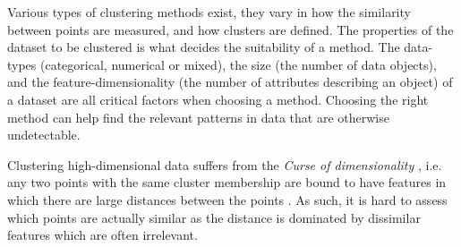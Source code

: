 \documentclass[../report.tex]{subfiles}
\begin{document}








Various types of clustering methods exist, they vary in how the similarity between points are measured, and how clusters are defined.
The properties of the dataset to be clustered is what decides the suitability of a method. The data-types (categorical, numerical or mixed), the size (the number of data objects), and the feature-dimensionality (the number of attributes describing an object) of a dataset are all critical factors when choosing a method. Choosing the right method can help find the relevant patterns in data that are otherwise undetectable.

Clustering high-dimensional data suffers from the \textit{Curse of dimensionality} \cite{Jain1999, Parsons2004, Deng2010}, i.e. any two points with the same cluster membership are bound to have features in which there are large distances between the points \cite{Domeniconi2007}. As such, it is hard to assess which points are actually similar as the distance is dominated by dissimilar features which are often irrelevant.
\end{document}
